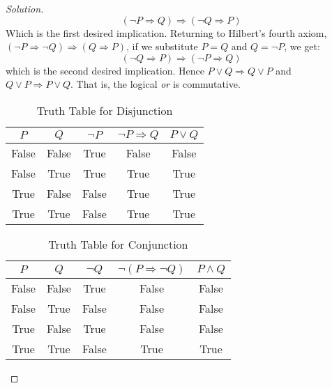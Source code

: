 \documentclass{article}
\theoremstyle{normal}
\begin{document}
\begin{proof}[Solution]
\begin{equation}
            (\neg{P}\Rightarrow{Q})\Rightarrow(\neg{Q}\Rightarrow{P})
        \end{equation}
        Which is the first desired implication. Returning to Hilbert's fourth
        axiom, $(\neg{P}\Rightarrow\neg{Q})\Rightarrow(Q\Rightarrow{P})$, if
        we substitute $P=Q$ and $Q=\neg{P}$, we get:
        \begin{equation}
            (\neg{Q}\Rightarrow{P})\Rightarrow(\neg{P}\Rightarrow{Q})
        \end{equation}
        which is the second desired implication. Hence
        $P\lor{Q}\Rightarrow{Q}\lor{P}$ and $Q\lor{P}\Rightarrow{P}\lor{Q}$.
        That is, the logical \textit{or} is commutative.
        \begin{table}
            \centering
            \begin{tabular}{c | c | c | c | c}
                $P$&$Q$&$\neg{P}$&$\neg{P}\Rightarrow{Q}$&$P\lor{Q}$\\
                \hline
                False&False&True&False&False\\
                False&True&True&True&True\\
                True&False&False&True&True\\
                True&True&False&True&True
            \end{tabular}
            \caption{Truth Table for Disjunction}
            \label{tab:truth_tab_disjunction}
        \end{table}
        \begin{table}
            \centering
            \begin{tabular}{c | c | c | c | c}
                $P$&$Q$&$\neg{Q}$&$\neg(P\Rightarrow\neg{Q})$&$P\land{Q}$\\
                \hline
                False&False&True&False&False\\
                False&True&False&False&False\\
                True&False&True&False&False\\
                True&True&False&True&True
            \end{tabular}
            \caption{Truth Table for Conjunction}
            \label{tab:truth_tab_conjunction}
        \end{table}
    \end{proof}
    \newpage
    \color{blue}
\end{document}
